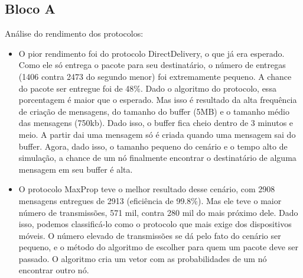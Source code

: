 \documentclass[conference]{IEEEtran}
\begin{document}
\subsection{Bloco A}
  Análise do rendimento dos protocolos:
  \begin{itemize}
    \item O pior rendimento foi do protocolo DirectDelivery, o que já era esperado. Como ele só entrega 
      o pacote para seu destinatário, o número de entregas (1406 contra 2473 do segundo menor) foi 
			extremamente pequeno.
			A chance do pacote ser entregue foi de 48\%. Dado o algoritmo do protocolo, essa porcentagem é 
			maior que o esperado. Mas isso é resultado da alta frequência de criação de mensagens, do tamanho 
			do buffer (5MB) e o tamanho médio das mensagens (750kb). Dado isso, o buffer fica cheio dentro de 
			3 minutos e meio. A partir dai uma mensagem só é criada quando uma mensagem sai do buffer. Agora, 
			dado isso, o tamanho pequeno do cenário e o tempo alto de simulação, a chance de um nó finalmente 
			encontrar o destinatário de alguma mensagem em seu buffer é alta.
		\item O protocolo MaxProp teve o melhor resultado desse cenário, com 2908 mensagens entregues de 2913
			(eficiência de 99.8\%). Mas ele teve o maior número de transmissões, 571 mil, contra 280 mil do mais
			próximo dele. Dado isso, podemos classificá-lo como o protocolo que mais exige dos dispositivos móveis.
			O número elevado de transmissões se dá pelo fato do cenário ser pequeno, e o método do algoritmo 
			de escolher para quem um pacote deve ser passado. O algoritmo cria um vetor com as probabilidades
			de um nó encontrar outro nó. 
			

\end{itemize}
\end{document}
